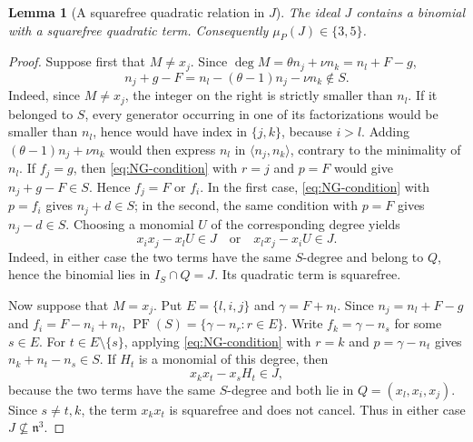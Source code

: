 \documentclass[10pt]{amsart}
\theoremstyle{plain}
\newtheorem{lemma}{Lemma}[section]
\begin{document}
\begin{lemma}[A squarefree quadratic relation in \(J\)]
\label{lem:type3-pfaffian}
The ideal \(J\) contains a binomial with a squarefree quadratic term.
Consequently \(\mu_P(J)\in\{3,5\}\).
\end{lemma}
\begin{proof}
Suppose first that \(M\ne x_j\).  Since
\(\deg M=\theta n_j+\nu n_k=n_l+F-g\),
\[
n_j+g-F=n_l-(\theta-1)n_j-\nu n_k\notin S.
\]
Indeed, since \(M\ne x_j\), the integer on the right is strictly smaller
than \(n_l\).  If it belonged to \(S\), every generator occurring in one
of its factorizations would be smaller than \(n_l\), hence would have index
in \(\{j,k\}\), because \(i>l\).  Adding
\((\theta-1)n_j+\nu n_k\) would then express \(n_l\) in
\(\langle n_j,n_k\rangle\), contrary to the minimality of \(n_l\).  If \(f_j=g\),
then \eqref{eq:NG-condition} with \(r=j\) and \(p=F\) would give
\(n_j+g-F\in S\).  Hence \(f_j=F\) or \(f_i\).  In the first case,
\eqref{eq:NG-condition} with \(p=f_i\) gives \(n_j+d\in S\); in the
second, the same condition with \(p=F\) gives \(n_j-d\in S\).
Choosing a monomial \(U\) of the corresponding degree yields
\begin{equation}\label{eq:type3-quadratic-Mneqxj}
x_ix_j-x_lU\in J
\quad\text{or}\quad
x_lx_j-x_iU\in J.
\end{equation}
Indeed, in either case the two terms have the same \(S\)-degree and
belong to \(Q\), hence the binomial lies in \(I_S\cap Q=J\).  Its
quadratic term is squarefree.

Now suppose that \(M=x_j\).  Put \(E=\{l,i,j\}\) and
\(\gamma=F+n_l\).  Since \(n_j=n_l+F-g\) and
\(f_i=F-n_i+n_l\),
\(\operatorname{PF}(S)=\{\gamma-n_r:r\in E\}\).
Write \(f_k=\gamma-n_s\) for some \(s\in E\).  For
\(t\in E\setminus\{s\}\), applying \eqref{eq:NG-condition} with
\(r=k\) and \(p=\gamma-n_t\) gives
\(n_k+n_t-n_s\in S\).  If \(H_t\) is a monomial of this degree, then
\begin{equation}\label{eq:type3-quadratic-Meqxj}
x_kx_t-x_sH_t\in J,
\end{equation}
because the two terms have the same \(S\)-degree and both lie in
\(Q=(x_l,x_i,x_j)\).  Since \(s\ne t,k\), the term \(x_kx_t\) is
squarefree and does not cancel.  Thus in either case
\(J\not\subseteq\mathfrak n^3\).


\end{proof}
\end{document}
